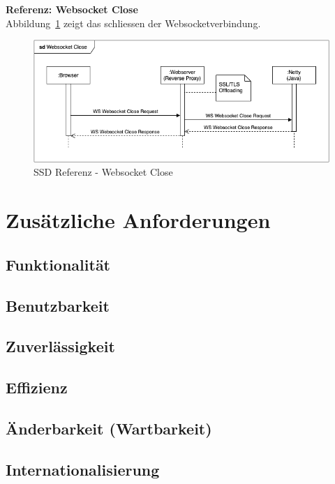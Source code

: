 \documentclass[11pt,ngerman]{article}
\begin{document}
        \noindent \textbf{Referenz: \Gls{Websocket} Close} \\
        Abbildung~\ref{fig:SSDReferenzWebsocketClose} zeigt das schliessen der Websocketverbindung.
        \begin{figure}[H]
            \centering
            \includegraphics[scale=0.6]{figures/SSD-Websocket_Close.png}
            \caption{SSD Referenz - \Gls{Websocket} Close}
            \label{fig:SSDReferenzWebsocketClose}
        \end{figure}


    \section{Zusätzliche Anforderungen}

    \subsection{Funktionalität}

    \subsection{Benutzbarkeit}

    \subsection{Zuverlässigkeit}

    \subsection{Effizienz}

    \subsection{Änderbarkeit (Wartbarkeit)}

    \subsection{Internationalisierung}
\end{document}
